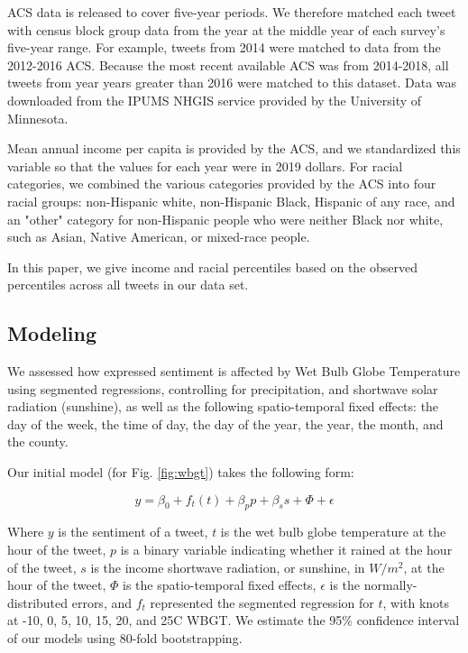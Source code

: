 \documentclass[fleqn,10pt]{wlscirep}
\begin{document}
ACS data is released to cover five-year periods.  We therefore matched each tweet with census block group data from the year at the middle year of each survey's five-year range.  For example, tweets from 2014 were matched to data from the 2012-2016 ACS.  Because the most recent available ACS was from 2014-2018, all tweets from year years greater than 2016 were matched to this dataset.  Data was downloaded from the IPUMS NHGIS service provided by the University of Minnesota.

Mean annual income per capita is provided by the ACS, and we standardized this variable so that the values for each year were in 2019 dollars.  For racial categories, we combined the various categories provided by the ACS into four racial groups: non-Hispanic white, non-Hispanic Black, Hispanic of any race, and an "other" category for non-Hispanic people who were neither Black nor white, such as Asian, Native American, or mixed-race people.

In this paper, we give income and racial percentiles based on the observed percentiles across all tweets in our data set.
    
\subsection*{Modeling}
We assessed how expressed sentiment is affected by Wet Bulb Globe Temperature using segmented regressions, controlling for precipitation, and shortwave solar radiation (sunshine), as well as the following spatio-temporal fixed effects: the day of the week, the time of day, the day of the year, the year, the month, and the county.  

Our initial model (for Fig. \ref{fig:wbgt}) takes the following form:

\begin{equation}
    y = \beta_0 + f_t(t) + \beta_p p + \beta_s s + \Phi + \epsilon
    \label{mod:1}
\end{equation}

Where $y$ is the sentiment of a tweet, $t$ is the wet bulb globe temperature at the hour of the tweet, $p$ is a binary variable indicating whether it rained at the hour of the tweet, $s$ is the income shortwave radiation, or sunshine, in $W/m^2$, at the hour of the tweet, $\Phi$ is the spatio-temporal fixed effects, $\epsilon$ is the normally-distributed errors, and $f_t$ represented the segmented regression for $t$, with knots at -10\textdegree, 0\textdegree, 5\textdegree, 10\textdegree, 15\textdegree, 20\textdegree, and 25\textdegree C WBGT.  We estimate the 95\% confidence interval of our models using 80-fold bootstrapping.  
\end{document}
